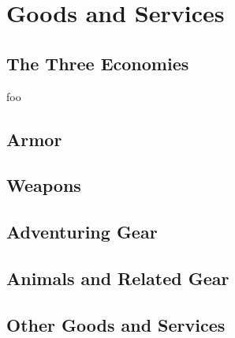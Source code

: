 
\newcommand{\armorentry}[4]{\ability{#1}{\textit{#3}}  #4}


\chapter{Goods and Services}
\section{The Three Economies}
foo
\section{Armor}

\section{Weapons}

\section{Adventuring Gear}

\section{Animals and Related Gear}

\section{Other Goods and Services}
